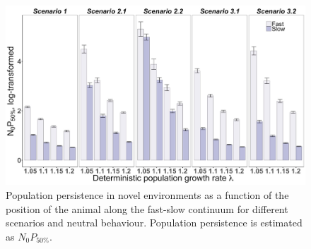 \begin{figure}
\centering
\includegraphics[width=\textwidth]{./Figures/Appendix3_2/Fig_5.jpg}
\caption[Effects on $N_{0}P_{50\%}$ with neutral behaviour]{
Population persistence in novel environments as a function of the
position of the animal along the fast-slow continuum for different scenarios and
neutral behaviour. Population persistence is estimated as $N_{0}P_{50\%}$.}
\label{fig:figApp3.2.5}
\end{figure}

